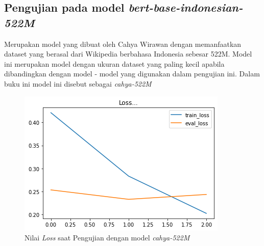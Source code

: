 \subsection{Pengujian pada model \textit{bert-base-indonesian-522M}}

Merupakan model yang dibuat oleh Cahya Wirawan dengan memanfaatkan dataset yang berasal dari Wikipedia berbahasa Indonesia sebesar 522M. Model ini merupakan model dengan ukuran dataset yang paling kecil apabila dibandingkan dengan model - model yang digunakan dalam pengujian ini. Dalam buku ini model ini disebut sebagai \textit{cahya-522M}

\begin{figure}[h]
    \begin{center}
        \includegraphics[width= 0.9\linewidth]{gambar/loss_cahya_bert_522.png}
        \caption{Nilai \textit{Loss} saat Pengujian dengan model \textit{cahya-522M}}
        \label{fig: loss_bert_cahya522}
    \end{center}
\end{figure}

